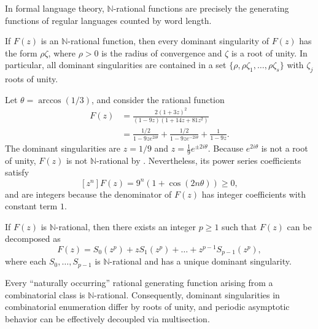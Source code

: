 In formal language theory, \(\mathbb{N}\)-rational functions are precisely the generating functions of regular languages counted by word length.

\begin{theorem}
    \label{thm:berstel}
    If \(F(z)\) is an \(\mathbb{N}\)-rational function, then every dominant singularity of \(F(z)\) has the form \(\rho \zeta\), where \(\rho > 0\) is the radius of convergence and \(\zeta\) is a root of unity.
    In particular, all dominant singularities are contained in a set \(\{\rho, \rho \zeta_1, \dots, \rho \zeta_s\}\) with \(\zeta_j\) roots of unity.
\end{theorem}

\begin{example}
    Let \(\theta = \arccos(1/3)\), and consider the rational function
    \begin{align*}
        F(z) &= \frac{2(1+3z)^2}{(1-9z)(1+14z+81z^2)} \\
        &= \frac{1/2}{1 - 9z e^{2i\theta}} + \frac{1/2}{1 - 9z e^{-2i\theta}} + \frac{1}{1 - 9z}.
    \end{align*}
    The dominant singularities are \(z = 1/9\) and \(z = \frac{1}{9} e^{\pm 2i\theta}\).
    Because \(e^{2i\theta}\) is not a root of unity, \(F(z)\) is not \(\mathbb{N}\)-rational by .
    Nevertheless, its power series coefficients satisfy
    \[
        [z^n] F(z) = 9^n \left( 1 + \cos(2n\theta) \right) \ge 0,
    \]
    and are integers because the denominator of \(F(z)\) has integer coefficients with constant term \(1\).
\end{example}

\begin{corollary}
    \label{cor:n-rational-multisection}
    If \(F(z)\) is \(\mathbb{N}\)-rational, then there exists an integer \(p \ge 1\) such that \(F(z)\) can be decomposed as
    \[
        F(z) = S_0(z^p) + z S_1(z^p) + \dots + z^{p-1} S_{p-1}(z^p),
    \]
    where each \(S_0, \dots, S_{p-1}\) is \(\mathbb{N}\)-rational and has a unique dominant singularity.
\end{corollary}

\begin{remark}
    Every ``naturally occurring'' rational generating function arising from a combinatorial class is \(\mathbb{N}\)-rational.
    Consequently, dominant singularities in combinatorial enumeration differ by roots of unity, and periodic asymptotic behavior can be effectively decoupled via multisection.
\end{remark}


